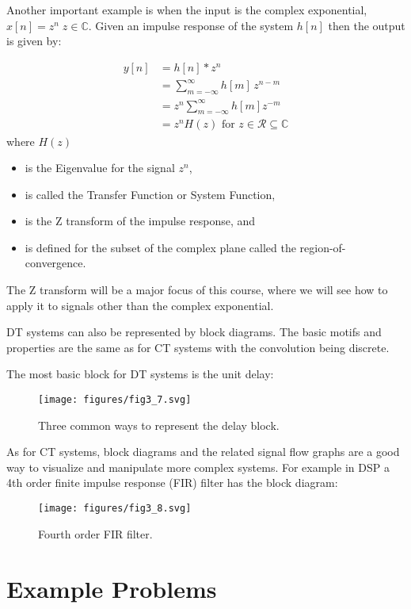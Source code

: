 \documentclass{article}
\begin{document}
Another important example is when the input is the complex exponential, $x[n] = z^n\; z\in\mathbb{C}$. Given an impulse response of the system $h[n]$ then the output is given by:

\begin{align}
  y[n] &= h[n] * z^{n}\\
  &= \sum\limits_{m = -\infty}^{\infty} h[m]\, z^{n-m} \\
  &= z^{n} \sum\limits_{m = -\infty}^{\infty} h[m]z^{-m} \\
  &= z^{n} H(z) \text{ for } z\in \mathcal{R} \subseteq \mathbb{C}
\end{align}
where $H(z)$

\begin{itemize}
\item is the Eigenvalue for the signal $z^{n}$, 
\item is called the Transfer Function or System Function,
\item is the Z transform of the impulse response, and
\item is defined for the subset of the complex plane called the region-of-convergence.
\end{itemize}

The Z transform will be a major focus of this course, where we will see how to apply it to signals other than the complex exponential.

DT systems can also be represented by block diagrams. The basic motifs and properties are the same as for CT systems with the convolution being discrete.

The most basic block for DT systems is the unit delay:

\begin{figure}
  \centering
  \texttt{[image: figures/fig3\_7.svg]}
  \caption{Three common ways to represent the delay block.}
\end{figure}

As for CT systems, block diagrams and the related signal flow graphs are a good way to visualize and manipulate more complex systems. For example in DSP a 4th order finite impulse response (FIR) filter has the block diagram:

\begin{figure}
  \centering
  \texttt{[image: figures/fig3\_8.svg]}
  \caption{Fourth order FIR filter.}
\end{figure}

\section{Example Problems}
\end{document}
